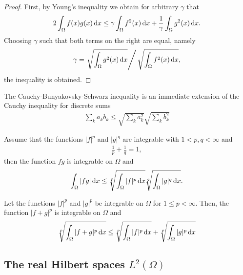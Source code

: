\begin{proof}
  First, by Young's inequality we obtain for arbitrary
  $\gamma$ that
  \begin{gather*}
    2 \int_\Omega f(x)g(x)\,\mathrm{d} x
    \le \gamma \int_\Omega f^2(x)\,\mathrm{d} x
    + \frac1\gamma \int_\Omega g^2(x)\,\mathrm{d} x.
  \end{gather*}
  Choosing $\gamma$ such that both terms on the right are equal,
  namely
  \begin{gather*}
    \gamma = \left. \sqrt{\int_\Omega g^2(x)\,\mathrm{d} x} \right/ \sqrt{\int_\Omega f^2(x)\,\mathrm{d} x},
  \end{gather*}
  the inequality is obtained.
\end{proof}

\begin{note}
  The Cauchy-Bunyakovsky-Schwarz inequality is an immediate extension
  of the Cauchy inequality for discrete sums
  \begin{gather}
    \sum_k a_k b_k \le \sqrt{\sum_ka_k^2} \sqrt{\sum_kb_k^2}
  \end{gather}
\end{note}

\begin{lemma}
  Assume that the functions $|f|^p$ and $|g|^q$ are integrable with
  $1<p,q<\infty$ and
  \begin{gather}
    \label{eq:lp:5}
    \frac1p+\frac1q=1,
  \end{gather}
  then the function $fg$ is integrable on $\Omega$ and
  \begin{gather}
    \label{eq:lp:6}
    \int_\Omega |fg| \,\mathrm{d} x \le \sqrt[p] {\int_\Omega |f|^p \,\mathrm{d} x} \sqrt[q] {\int_\Omega |g|^q \,\mathrm{d} x}.
  \end{gather}
\end{lemma}

\begin{lemma}
  Let the functions $|f|^p$ and $|g|^p$ be integrable on $\Omega$ for
  $1\le p < \infty$. Then, the function $|f+g|^p$ is integrable on
  $\Omega$ and
  \begin{gather}
    \label{eq:lp:7}
    \sqrt[p] {\int_\Omega |f+g|^p \,\mathrm{d} x}
    \le \sqrt[p] {\int_\Omega |f|^p \,\mathrm{d} x}
    +\sqrt[p] {\int_\Omega |g|^p \,\mathrm{d} x}
  \end{gather}
\end{lemma}

\subsection{The real Hilbert spaces $L^2(\Omega)$}

